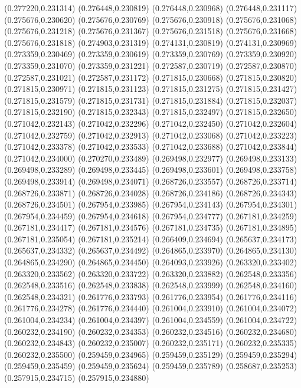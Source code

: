 (0.277220,0.231314)
(0.276448,0.230819)
(0.276448,0.230968)
(0.276448,0.231117)
(0.275676,0.230620)
(0.275676,0.230769)
(0.275676,0.230918)
(0.275676,0.231068)
(0.275676,0.231218)
(0.275676,0.231367)
(0.275676,0.231518)
(0.275676,0.231668)
(0.275676,0.231818)
(0.274903,0.231319)
(0.274131,0.230819)
(0.274131,0.230969)
(0.273359,0.230469)
(0.273359,0.230619)
(0.273359,0.230769)
(0.273359,0.230920)
(0.273359,0.231070)
(0.273359,0.231221)
(0.272587,0.230719)
(0.272587,0.230870)
(0.272587,0.231021)
(0.272587,0.231172)
(0.271815,0.230668)
(0.271815,0.230820)
(0.271815,0.230971)
(0.271815,0.231123)
(0.271815,0.231275)
(0.271815,0.231427)
(0.271815,0.231579)
(0.271815,0.231731)
(0.271815,0.231884)
(0.271815,0.232037)
(0.271815,0.232190)
(0.271815,0.232343)
(0.271815,0.232497)
(0.271815,0.232650)
(0.271042,0.232143)
(0.271042,0.232296)
(0.271042,0.232450)
(0.271042,0.232604)
(0.271042,0.232759)
(0.271042,0.232913)
(0.271042,0.233068)
(0.271042,0.233223)
(0.271042,0.233378)
(0.271042,0.233533)
(0.271042,0.233688)
(0.271042,0.233844)
(0.271042,0.234000)
(0.270270,0.233489)
(0.269498,0.232977)
(0.269498,0.233133)
(0.269498,0.233289)
(0.269498,0.233445)
(0.269498,0.233601)
(0.269498,0.233758)
(0.269498,0.233914)
(0.269498,0.234071)
(0.268726,0.233557)
(0.268726,0.233714)
(0.268726,0.233871)
(0.268726,0.234028)
(0.268726,0.234186)
(0.268726,0.234343)
(0.268726,0.234501)
(0.267954,0.233985)
(0.267954,0.234143)
(0.267954,0.234301)
(0.267954,0.234459)
(0.267954,0.234618)
(0.267954,0.234777)
(0.267181,0.234259)
(0.267181,0.234417)
(0.267181,0.234576)
(0.267181,0.234735)
(0.267181,0.234895)
(0.267181,0.235054)
(0.267181,0.235214)
(0.266409,0.234694)
(0.265637,0.234173)
(0.265637,0.234332)
(0.265637,0.234492)
(0.264865,0.233970)
(0.264865,0.234130)
(0.264865,0.234290)
(0.264865,0.234450)
(0.264093,0.233926)
(0.263320,0.233402)
(0.263320,0.233562)
(0.263320,0.233722)
(0.263320,0.233882)
(0.262548,0.233356)
(0.262548,0.233516)
(0.262548,0.233838)
(0.262548,0.233999)
(0.262548,0.234160)
(0.262548,0.234321)
(0.261776,0.233793)
(0.261776,0.233954)
(0.261776,0.234116)
(0.261776,0.234278)
(0.261776,0.234440)
(0.261004,0.233910)
(0.261004,0.234072)
(0.261004,0.234234)
(0.261004,0.234397)
(0.261004,0.234559)
(0.261004,0.234722)
(0.260232,0.234190)
(0.260232,0.234353)
(0.260232,0.234516)
(0.260232,0.234680)
(0.260232,0.234843)
(0.260232,0.235007)
(0.260232,0.235171)
(0.260232,0.235335)
(0.260232,0.235500)
(0.259459,0.234965)
(0.259459,0.235129)
(0.259459,0.235294)
(0.259459,0.235459)
(0.259459,0.235624)
(0.259459,0.235789)
(0.258687,0.235253)
(0.257915,0.234715)
(0.257915,0.234880)
